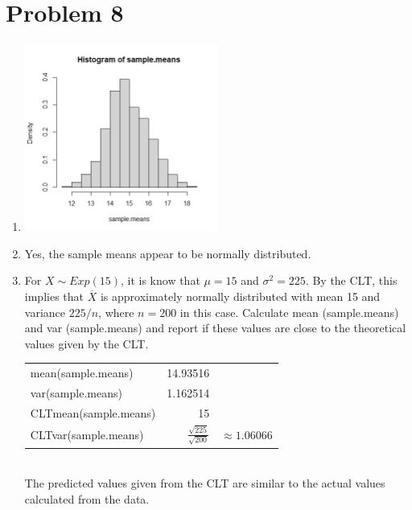 \documentclass{article}
\begin{document}
\pagebreak
\section*{Problem 8}

\begin{enumerate}[label=(\alph*)]
    \item \includegraphics[width=0.5\textwidth]{histogram.png}
    \item Yes, the sample means appear to be normally distributed.
    \item For \(X \sim Exp(15)\), it is know that \(\mu = 15\) and \(\sigma^2 = 225\). By the CLT, this implies that \(\overline{X}\) is approximately normally distributed with mean 15 and variance \(225/n\), where \(n = 200\) in this case. Calculate mean (sample.means) and var (sample.means) and report if these values are close to the theoretical values given by the CLT. \\
          \begin{tabular}{l|rl}
              mean(sample.means)    & 14.93516                                                \\
              var(sample.means)     & 1.162514                                                \\
              CLTmean(sample.means) & 15                                                      \\
              CLTvar(sample.means)  & \(\frac{\sqrt{225}}{\sqrt{200}}\) & \(\approx 1.06066\) \\
          \end{tabular} \\[1.0em]
          The predicted values given from the CLT are similar to the actual values calculated from the data.
\end{enumerate}

\pagebreak
\end{document}
